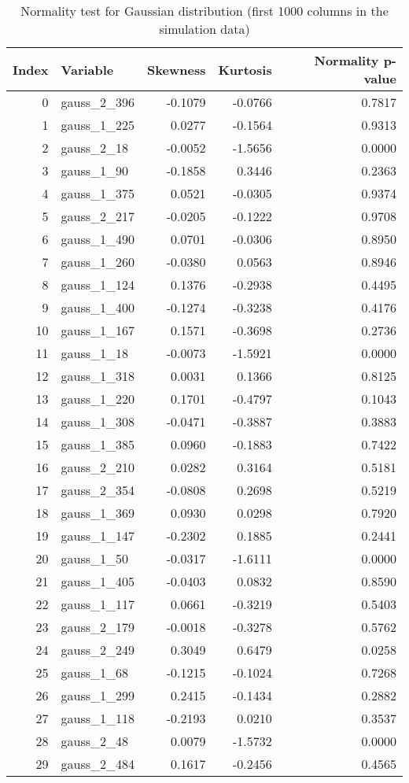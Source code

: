 \begin{table}[!h]
\centering
\caption{Normality test for Gaussian distribution (first 1000 columns in the simulation data)}
\label{tab:normal_metrics}
\begin{tabular}{r l r r r}
\toprule
\textbf{Index} & \textbf{Variable} & \textbf{Skewness} & \textbf{Kurtosis} & \textbf{Normality p-value} \\
\midrule
0  & gauss\_2\_396 & -0.1079 & -0.0766 & 0.7817 \\
1  & gauss\_1\_225 & 0.0277 & -0.1564 & 0.9313 \\
2  & gauss\_2\_18  & -0.0052 & -1.5656 & 0.0000 \\
3  & gauss\_1\_90  & -0.1858 & 0.3446  & 0.2363 \\
4  & gauss\_1\_375 & 0.0521  & -0.0305 & 0.9374 \\
5  & gauss\_2\_217 & -0.0205 & -0.1222 & 0.9708 \\
6  & gauss\_1\_490 & 0.0701  & -0.0306 & 0.8950 \\
7  & gauss\_1\_260 & -0.0380 & 0.0563  & 0.8946 \\
8  & gauss\_1\_124 & 0.1376  & -0.2938 & 0.4495 \\
9  & gauss\_1\_400 & -0.1274 & -0.3238 & 0.4176 \\
10 & gauss\_1\_167 & 0.1571  & -0.3698 & 0.2736 \\
11 & gauss\_1\_18  & -0.0073 & -1.5921 & 0.0000 \\
12 & gauss\_1\_318 & 0.0031  & 0.1366  & 0.8125 \\
13 & gauss\_1\_220 & 0.1701  & -0.4797 & 0.1043 \\
14 & gauss\_1\_308 & -0.0471 & -0.3887 & 0.3883 \\
15 & gauss\_1\_385 & 0.0960  & -0.1883 & 0.7422 \\
16 & gauss\_2\_210 & 0.0282  & 0.3164  & 0.5181 \\
17 & gauss\_2\_354 & -0.0808 & 0.2698  & 0.5219 \\
18 & gauss\_1\_369 & 0.0930  & 0.0298  & 0.7920 \\
19 & gauss\_1\_147 & -0.2302 & 0.1885  & 0.2441 \\
20 & gauss\_1\_50  & -0.0317 & -1.6111 & 0.0000 \\
21 & gauss\_1\_405 & -0.0403 & 0.0832  & 0.8590 \\
22 & gauss\_1\_117 & 0.0661  & -0.3219 & 0.5403 \\
23 & gauss\_2\_179 & -0.0018 & -0.3278 & 0.5762 \\
24 & gauss\_2\_249 & 0.3049  & 0.6479  & 0.0258 \\
25 & gauss\_1\_68  & -0.1215 & -0.1024 & 0.7268 \\
26 & gauss\_1\_299 & 0.2415  & -0.1434 & 0.2882 \\
27 & gauss\_1\_118 & -0.2193 & 0.0210  & 0.3537 \\
28 & gauss\_2\_48  & 0.0079  & -1.5732 & 0.0000 \\
29 & gauss\_2\_484 & 0.1617  & -0.2456 & 0.4565 \\
\bottomrule
\end{tabular}
\end{table}


